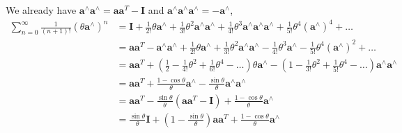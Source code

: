 \documentclass[a4paper, 12pt]{article}
\begin{document}
    We already have $\boldsymbol{a}^{\wedge} \boldsymbol{a}^{\wedge} = \boldsymbol{a} \boldsymbol{a}^{T} - \boldsymbol{I}$ and $\boldsymbol{a}^{\wedge} \boldsymbol{a}^{\wedge} \boldsymbol{a}^{\wedge} = -\boldsymbol{a}^{\wedge}$,
    \begin{equation*}
    \begin{aligned}
        \sum_{n=0}^{\infty} \frac{1}{(n+1)!} \left(\theta \boldsymbol{a}^{\wedge} \right)^{n}
        &=\boldsymbol{I} + \frac{1}{2!} \theta \boldsymbol{a}^{\wedge} + \frac{1}{3!} \theta^{2} \boldsymbol{a}^{\wedge} \boldsymbol{a}^{\wedge} + \frac{1}{4!} \theta^{3} \boldsymbol{a}^{\wedge} \boldsymbol{a}^{\wedge} \boldsymbol{a}^{\wedge} + \frac{1}{5!} \theta^{4} \left(\boldsymbol{a}^{\wedge}\right)^{4} + \ldots \\
        &=\boldsymbol{a} \boldsymbol{a}^{T} - \boldsymbol{a}^{\wedge} \boldsymbol{a}^{\wedge} + \frac{1}{2!} \theta \boldsymbol{a}^{\wedge} + \frac{1}{3!} \theta^{2} \boldsymbol{a}^{\wedge} \boldsymbol{a}^{\wedge} - \frac{1}{4!} \theta^{3} \boldsymbol{a}^{\wedge} - \frac{1}{5!} \theta^{4}\left(\boldsymbol{a}^{\wedge}\right)^{2} + \ldots \\
        &=\boldsymbol{a} \boldsymbol{a}^{T}+\left(\frac{1}{2} -\frac{1}{4!} \theta^{2}+\frac{1}{6!} \theta^{4}-\ldots\right)\theta \boldsymbol{a}^{\wedge}-\left(1-\frac{1}{3!} \theta^{2}+\frac{1}{5!} \theta^{4}-\ldots\right) \boldsymbol{a}^{\wedge} \boldsymbol{a}^{\wedge} \\
        &=\boldsymbol{a} \boldsymbol{a}^{T} + \frac{1-\cos \theta}{\theta} \boldsymbol{a}^{\wedge} - \frac{\sin \theta}{\theta} \boldsymbol{a}^{\wedge} \boldsymbol{a}^{\wedge} \\
        &=\boldsymbol{a} \boldsymbol{a}^{T} - \frac{\sin \theta}{\theta} (\boldsymbol{a} \boldsymbol{a}^{T} - \boldsymbol{I}) + \frac{1-\cos \theta}{\theta} \boldsymbol{a}^{\wedge} \\
        &=\frac{\sin \theta}{\theta} \boldsymbol{I}+\left(1-\frac{\sin \theta}{\theta}\right) \boldsymbol{a} \boldsymbol{a}^{T}+\frac{1-\cos \theta}{\theta} \boldsymbol{a}^{\wedge}
    \end{aligned}
    \end{equation*}
    
\end{document}
